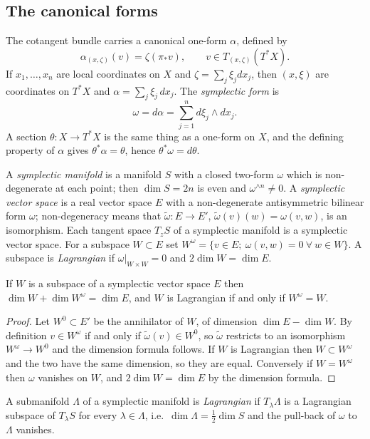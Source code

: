\subsection{The canonical forms}
The cotangent bundle carries a canonical one-form $\alpha$, defined by
\begin{equation*}
  \alpha_{(x,\zeta)}(v)=\zeta(\pi_*v),\qquad v\in T_{(x,\zeta)}(T^*X).
\end{equation*}
If $x_1,\dots,x_n$ are local coordinates on $X$ and $\zeta=\sum_j\xi_jdx_j$, then
$(x,\xi)$ are coordinates on $T^*X$ and $\alpha=\sum_j\xi_j\,dx_j$.  The
\emph{symplectic form} is
\begin{equation*}
  \omega=d\alpha=\sum_{j=1}^nd\xi_j\wedge dx_j .
\end{equation*}
A section $\theta:X\to T^*X$ is the same thing as a one-form on $X$, and the
defining property of $\alpha$ gives $\theta^*\alpha=\theta$, hence
$\theta^*\omega=d\theta$.

A \emph{symplectic manifold} is a manifold $S$ with a closed two-form $\omega$
which is non-degenerate at each point; then $\dim S=2n$ is even and
$\omega^{\wedge n}\neq0$.  A \emph{symplectic vector space} is a real vector space
$E$ with a non-degenerate antisymmetric bilinear form $\omega$; non-degeneracy
means that $\tilde\omega:E\to E'$, $\tilde\omega(v)(w)=\omega(v,w)$, is an
isomorphism.  Each tangent space $T_zS$ of a symplectic manifold is a symplectic
vector space.  For a subspace $W\subset E$ set
$W^\omega=\{v\in E;\ \omega(v,w)=0\ \forall\ w\in W\}$.  A subspace is
\emph{Lagrangian} if $\omega|_{W\times W}=0$ and $2\dim W=\dim E$.

\begin{lemma}\label{hj:lem:lagrangian-linear}
  If $W$ is a subspace of a symplectic vector space $E$ then $\dim W+\dim
  W^\omega=\dim E$, and $W$ is Lagrangian if and only if $W^\omega=W$.
\end{lemma}
\begin{proof}
  Let $W^0\subset E'$ be the annihilator of $W$, of dimension $\dim E-\dim W$.
  By definition $v\in W^\omega$ if and only if $\tilde\omega(v)\in W^0$, so
  $\tilde\omega$ restricts to an isomorphism $W^\omega\to W^0$ and the dimension
  formula follows.  If $W$ is Lagrangian then $W\subset W^\omega$ and the two
  have the same dimension, so they are equal.  Conversely if $W=W^\omega$ then
  $\omega$ vanishes on $W$, and $2\dim W=\dim E$ by the dimension formula.
\end{proof}

A submanifold $\Lambda$ of a symplectic manifold is \emph{Lagrangian} if
$T_\lambda\Lambda$ is a Lagrangian subspace of $T_\lambda S$ for every
$\lambda\in\Lambda$, i.e.\ $\dim\Lambda=\frac12\dim S$ and the pull-back of
$\omega$ to $\Lambda$ vanishes.

